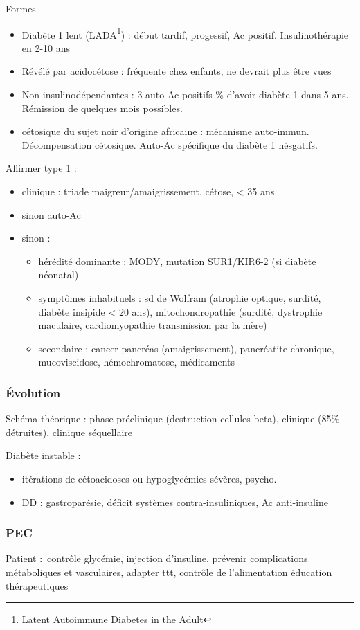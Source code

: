 \documentclass[11pt]{article}
\begin{document}
Formes
\begin{itemize}
\item Diabète 1 lent (LADA\footnote{Latent Autoimmune Diabetes in the Adult}) : début tardif, progessif, Ac positif. Insulinothérapie en 2-10 ans
\item Révélé par acidocétose : fréquente chez enfants, ne devrait plus être vues
\item Non insulinodépendantes : 3 auto-Ac positifs \% d'avoir diabète 1 dans
5 ans. Rémission de quelques mois possibles.
\item cétosique du sujet noir d'origine africaine : mécanisme
auto-immun. Décompensation cétosique. Auto-Ac spécifique du diabète 1
nésgatifs.
\end{itemize}

Affirmer type 1 :
\begin{itemize}
\item clinique : triade maigreur/amaigrissement, cétose, < 35 ans
\item sinon auto-Ac
\item sinon :
\begin{itemize}
\item hérédité dominante : MODY, mutation SUR1/KIR6-2 (si diabète néonatal)
\item symptômes inhabituels : sd de Wolfram (atrophie optique, surdité, diabète
insipide < 20 ans), mitochondropathie (surdité, dystrophie maculaire,
cardiomyopathie transmission par la mère)
\item secondaire : cancer pancréas (amaigrissement), pancréatite chronique,
mucoviscidose, hémochromatose, médicaments
\end{itemize}
\end{itemize}

\subsubsection{Évolution}
\label{sec:orge5ac9e2}
Schéma théorique : phase préclinique (destruction cellules beta), clinique (85\% détruites), clinique séquellaire

Diabète instable : 
\begin{itemize}
\item itérations de cétoacidoses ou hypoglycémies sévères, psycho.
\item DD : gastroparésie, déficit systèmes contra-insuliniques, Ac anti-insuline
\end{itemize}

\subsubsection{PEC}
\label{sec:org46df261}
Patient : contrôle glycémie, injection d'insuline, prévenir complications
métaboliques et vasculaires, adapter ttt, contrôle de l'alimentation \thus
éducation thérapeutiques
\end{document}
